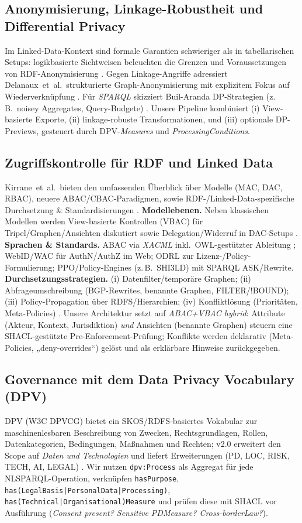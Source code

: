 \subsection{Anonymisierung, Linkage-Robustheit und Differential Privacy}
Im Linked-Data-Kontext sind formale Garantien schwieriger als in tabellarischen Setups: logikbasierte Sichtweisen beleuchten die Grenzen und Voraussetzungen von RDF-Anonymisierung \cite{logical-foundations-lda}. Gegen Linkage-Angriffe adressiert Delanaux~et~al.\ strukturierte Graph-Anonymisierung mit explizitem Fokus auf Wiederverknüpfung \cite{delanaux-linkage}. Für \emph{SPARQL} skizziert Buil-Aranda DP-Strategien (z.\,B.\ noisey Aggregates, Query-Budgete) \cite{builaranda-dp-sparql}. 
Unsere Pipeline kombiniert (i) View-basierte Exporte, (ii) linkage-robuste Transformationen, und (iii) optionale DP-Previews, gesteuert durch DPV-\emph{Measures} und \emph{ProcessingConditions}.

\subsection{Zugriffskontrolle für RDF und Linked Data}
Kirrane~et~al.\ bieten den umfassenden Überblick über Modelle (MAC, DAC, RBAC), neuere ABAC/CBAC-Paradigmen, sowie RDF-/Linked-Data-spezifische Durchsetzung \& Standardisierungen \cite{kirrane-ac-survey}. 
\textbf{Modellebenen.} Neben klassischen Modellen werden View-basierte Kontrollen (VBAC) für Tripel/Graphen/Ansichten diskutiert sowie Delegation/Widerruf in DAC-Setups \cite{kirrane-ac-survey}.  
\textbf{Sprachen \& Standards.} ABAC via \emph{XACML} inkl.\ OWL-gestützter Ableitung \cite{kirrane-ac-survey}; WebID/WAC für AuthN/AuthZ im Web; ODRL zur Lizenz-/Policy-Formulierung; PPO/Policy-Engines (z.\,B.\ SHI3LD) mit SPARQL ASK/Rewrite. 
\textbf{Durchsetzungsstrategien.} (i) Datenfilter/temporäre Graphen; (ii) Abfrageumschreibung (BGP-Rewrites, benannte Graphen, FILTER/!BOUND); (iii) Policy-Propagation über RDFS/Hierarchien; (iv) Konfliktlösung (Prioritäten, Meta-Policies) \cite{kirrane-ac-survey}. 
Unsere Architektur setzt auf \emph{ABAC+VBAC hybrid}: Attribute (Akteur, Kontext, Jurisdiktion) \emph{und} Ansichten (benannte Graphen) steuern eine SHACL-gestützte Pre-Enforcement-Prüfung; Konflikte werden deklarativ (Meta-Policies, „deny-overrides“) gelöst und als erklärbare Hinweise zurückgegeben.

\subsection{Governance mit dem Data Privacy Vocabulary (DPV)}
DPV (W3C DPVCG) bietet ein SKOS/RDFS-basiertes Vokabular zur maschinenlesbaren Beschreibung von Zwecken, Rechtsgrundlagen, Rollen, Datenkategorien, Bedingungen, Maßnahmen und Rechten; v2.0 erweitert den Scope auf \emph{Daten und Technologien} und liefert Erweiterungen (PD, LOC, RISK, TECH, AI, LEGAL) \cite{dpv2024w3c}. 
Wir nutzen \texttt{dpv:Process} als Aggregat für jede NL{\textrightarrow}SPARQL-Operation, verknüpfen \texttt{hasPurpose}, \texttt{has(LegalBasis|PersonalData|Processing)}, \texttt{has(Technical|Organisational)Measure} und prüfen diese mit SHACL vor Ausführung (\emph{Consent present? Sensitive PD{\textrightarrow}Measure? Cross-border{\textrightarrow}Law?}).

